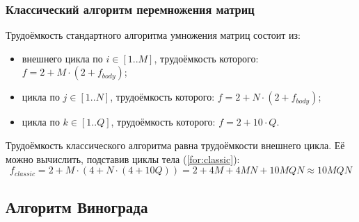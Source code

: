 \subsubsection{Классический алгоритм перемножения матриц}

Трудоёмкость стандартного алгоритма умножения матриц состоит из:

\begin{itemize}
	\item внешнего цикла по $i \in [1..M]$, трудоёмкость которого: $f = 2 + M \cdot (2 + f_{body})$;
	\item цикла по $j \in [1..N]$, трудоёмкость которого: $f = 2 + N \cdot (2 + f_{body})$;
	\item цикла по $k \in [1..Q]$, трудоёмкость которого: $f = 2 + 10 \cdot Q$.
\end{itemize}

Трудоёмкость классического алгоритма равна трудоёмкости внешнего цикла.
Её можно вычислить, подставив циклы тела (\ref{for:classic}):
\begin{equation}
	\label{for:classic}
	f_{classic} = 2 + M \cdot (4 + N \cdot (4 + 10Q)) = 2 + 4M + 4MN + 10MQN \approx 10MQN
\end{equation}

\subsection{Алгоритм Винограда}

